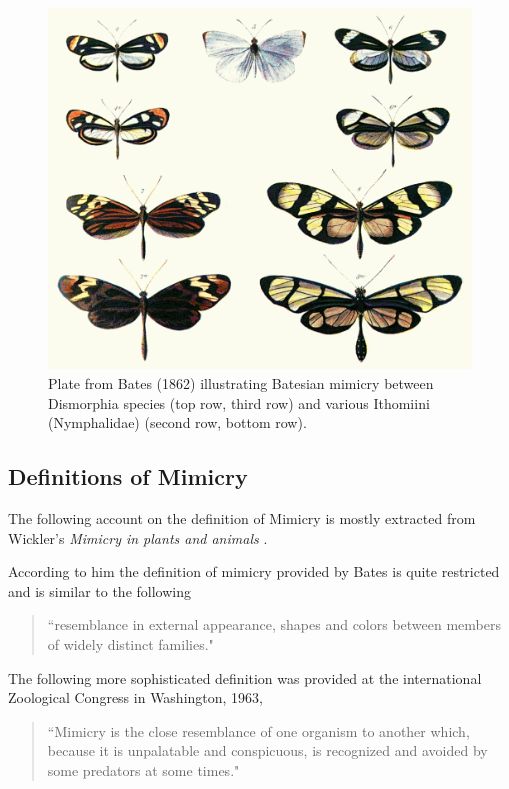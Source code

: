 \begin{figure}[H]
	\centering
	\includegraphics[scale=1]{images/Batesplate_ArM}
	\caption{Plate from Bates (1862) illustrating Batesian mimicry between Dismorphia species (top row, third row) and various Ithomiini (Nymphalidae) (second row, bottom row). \cite{bates1862}}
	\label{fig:batesian-butterfly}
\end{figure}

\subsection{Definitions of Mimicry}
The following account on the definition of Mimicry is mostly extracted from Wickler's \textit{Mimicry in plants and animals} \cite{wickler1986}. 

According to him the definition of mimicry provided by Bates \cite{bates1862} is quite restricted and is similar to the following

\begin{quote}
``resemblance in external appearance, shapes and colors between members of widely distinct families."
\end{quote}

The following more sophisticated definition was provided at the international Zoological Congress in Washington, 1963,

\begin{quote}
``Mimicry is the close resemblance of one organism to another which, because it is unpalatable and conspicuous, is recognized and avoided by some predators at some times."
\end{quote}

